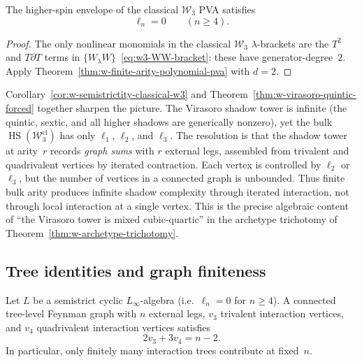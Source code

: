 \begin{corollary}
\label{cor:w-semistrictity-classical-w3}
The higher-spin envelope of the classical $\mathcal{W}_3$ PVA
satisfies
\[
\ell_n = 0 \qquad (n \ge 4).
\]
\end{corollary}

\begin{proof}
The only nonlinear monomials in the classical $\mathcal{W}_3$
$\lambda$-brackets are the $T^2$ and $T\partial T$ terms in
$\{W_\lambda W\}$~\eqref{eq:w3-WW-bracket}: these have
generator-degree~$2$.  Apply
Theorem~\ref{thm:w-finite-arity-polynomial-pva} with $d = 2$.
\end{proof}

\begin{remark}
\label{rem:w-semistrict-paradox}
Corollary~\ref{cor:w-semistrictity-classical-w3} and
Theorem~\ref{thm:w-virasoro-quintic-forced} together sharpen the
picture.  The Virasoro shadow tower is infinite (the quintic, sextic,
and all higher shadows are generically nonzero), yet the bulk
$\operatorname{HS}(\mathcal{W}_3^{\mathrm{cl}})$ has only $\ell_1$,
$\ell_2$, and $\ell_3$.  The resolution is that the shadow tower at
arity~$r$ records \emph{graph sums} with $r$ external legs, assembled
from trivalent and quadrivalent vertices by iterated contraction.  Each
vertex is controlled by $\ell_2$ or $\ell_3$, but the number of
vertices in a connected graph is unbounded.  Thus finite bulk arity
produces infinite shadow complexity through iterated interaction, not
through local interaction at a single vertex.  This is the precise
algebraic content of ``the Virasoro tower is mixed cubic-quartic'' in
the archetype trichotomy of
Theorem~\ref{thm:w-archetype-trichotomy}.
\end{remark}

\subsection{Tree identities and graph finiteness}
\label{subsec:semistrict-tree-identities}

\begin{proposition}
\label{prop:w-semistrict-tree-identity}
Let $L$ be a semistrict cyclic $L_\infty$-algebra (i.e.\
$\ell_n = 0$ for $n \ge 4$).  A connected tree-level Feynman graph
with $n$ external legs, $v_3$ trivalent interaction vertices, and
$v_4$ quadrivalent interaction vertices satisfies
\begin{equation}
\label{eq:w-semistrict-tree-identity}
2v_3 + 3v_4 = n - 2.
\end{equation}
In particular, only finitely many interaction trees contribute at
fixed~$n$.
\end{proposition}

